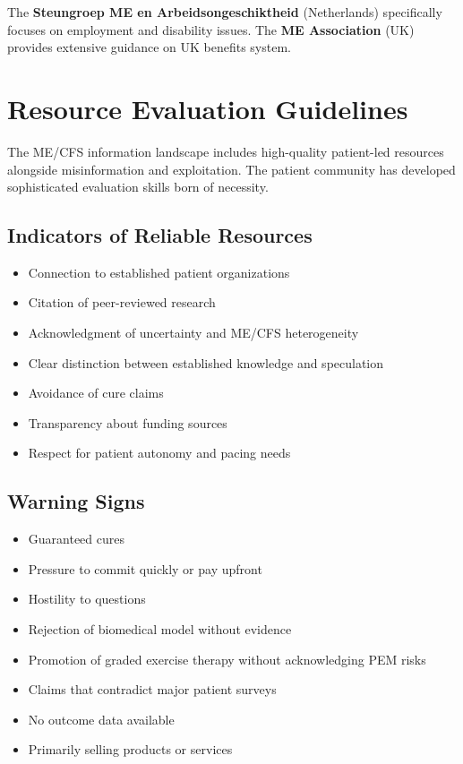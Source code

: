 The \textbf{Steungroep ME en Arbeidsongeschiktheid} (Netherlands) specifically focuses on employment and disability issues. The \textbf{ME Association} (UK) provides extensive guidance on UK benefits system.

\section{Resource Evaluation Guidelines}
\label{sec:evaluation-guidelines}

\begin{observation}
The ME/CFS information landscape includes high-quality patient-led resources alongside misinformation and exploitation. The patient community has developed sophisticated evaluation skills born of necessity.
\end{observation}

\subsection{Indicators of Reliable Resources}

\begin{itemize}
    \item Connection to established patient organizations
    \item Citation of peer-reviewed research
    \item Acknowledgment of uncertainty and ME/CFS heterogeneity
    \item Clear distinction between established knowledge and speculation
    \item Avoidance of cure claims
    \item Transparency about funding sources
    \item Respect for patient autonomy and pacing needs
\end{itemize}

\subsection{Warning Signs}

\begin{itemize}
    \item Guaranteed cures
    \item Pressure to commit quickly or pay upfront
    \item Hostility to questions
    \item Rejection of biomedical model without evidence
    \item Promotion of graded exercise therapy without acknowledging PEM risks
    \item Claims that contradict major patient surveys
    \item No outcome data available
    \item Primarily selling products or services
\end{itemize}

